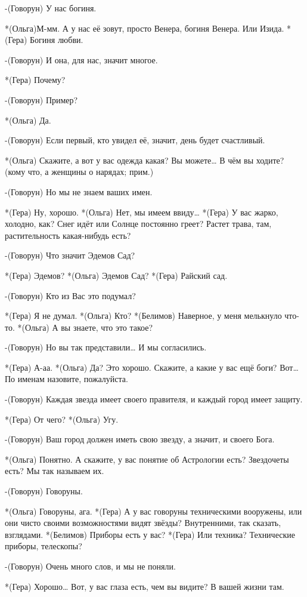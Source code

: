 -(Говорун) У нас богиня.

*(Ольга)М-мм. А у нас её зовут, просто Венера, богиня Венера. Или Изида.
*(Гера) Богиня любви.

-(Говорун) И она, для нас, значит многое.

*(Гера) Почему?

-(Говорун) Пример?

*(Ольга) Да.

-(Говорун) Если первый, кто увидел её, значит,  день будет счастливый.

*(Ольга) Скажите, а вот у вас одежда какая? Вы можете…  В чём вы ходите? (кому что, а женщины о нарядах; прим.)

-(Говорун) Но мы не знаем ваших имен.

*(Гера) Ну, хорошо.
*(Ольга) Нет, мы имеем ввиду…
*(Гера) У вас жарко, холодно, как? Снег идёт или Солнце постоянно греет? Растет трава, там, растительность какая-нибудь есть?

-(Говорун) Что значит Эдемов Сад?

*(Гера) Эдемов?
*(Ольга) Эдемов Сад?
*(Гера) Райский сад.

-(Говорун) Кто из Вас это подумал?

*(Гера) Я не думал.
*(Ольга) Кто?
*(Белимов) Наверное, у меня мелькнуло что-то.
*(Ольга) А вы знаете, что это такое?

-(Говорун) Но вы так представили… И мы согласились.

*(Гера) А-аа.
*(Ольга) Да? Это хорошо. Скажите, а какие у вас ещё боги? Вот… По именам назовите, пожалуйста.

-(Говорун) Каждая звезда имеет своего правителя, и каждый город имеет защиту.

*(Гера) От чего?
*(Ольга) Угу.

-(Говорун) Ваш город должен иметь свою звезду, а значит, и своего Бога.

*(Ольга) Понятно. А скажите, у вас понятие об Астрологии есть? Звездочеты есть? Мы так называем их.

-(Говорун) Говоруны.

*(Ольга) Говоруны, ага.
*(Гера) А у вас говоруны техническими вооружены, или они чисто своими возможностями видят звёзды? Внутренними, так сказать, взглядами.
*(Белимов) Приборы есть у вас?
*(Гера) Или техника? Технические приборы, телескопы?

-(Говорун) Очень много слов, и мы не поняли.

*(Гера) Хорошо… Вот, у вас глаза есть, чем вы видите? В вашей жизни там. 

